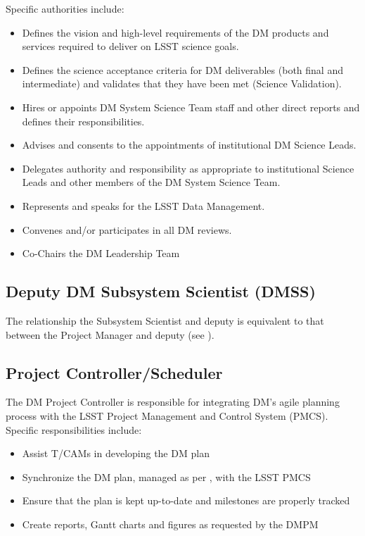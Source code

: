 Specific authorities include:

\begin{itemize}
\item Defines the vision and high-level requirements of the \gls{DM} products and services required to deliver on \gls{LSST} science goals.
\item Defines the science acceptance criteria for \gls{DM} deliverables (both final and intermediate) and validates that they have been met (Science \gls{Validation}).
\item Hires or appoints \gls{DM} System Science Team staff and other direct reports and defines their responsibilities.
\item Advises and consents to the appointments of institutional \gls{DM} Science Leads.
\item Delegates authority and responsibility as appropriate to institutional Science Leads and other members of the DM System Science Team.
\item Represents and speaks for the \gls{LSST} \gls{Data Management}.
\item Convenes and/or participates in all \gls{DM} reviews.
\item Co-Chairs the \gls{DM} Leadership Team
\end{itemize}

\subsection{Deputy DM \gls{Subsystem Scientist} (\gls{DMSS}) \label{role:ddmss} }

The relationship the \gls{Subsystem Scientist} and deputy is equivalent to that
between the \gls{Project Manager} and deputy (see ).


\subsection{Project Controller/Scheduler \label{role:pcon}}

The \gls{DM} Project Controller is responsible for integrating \gls{DM}'s agile planning process with the \gls{LSST} Project Management and Control System (\gls{PMCS}). Specific responsibilities include:

\begin{itemize}

  \item{Assist T/CAMs in developing the \gls{DM} plan}
  \item{Synchronize the \gls{DM} plan, managed as per , with the \gls{LSST} PMCS}
  \item{Ensure that the plan is kept up-to-date and milestones are properly tracked}
  \item{Create reports, Gantt charts and figures as requested by the \gls{DMPM}}

\end{itemize}

